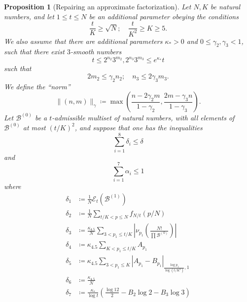 \documentclass[12pt,a4paper,reqno]{amsart}
\numberwithin{equation}{section}
\theoremstyle{plain}
\newtheorem{proposition}[theorem]{Proposition}
\theoremstyle{definition}
\newcommand\tuple{{\mathcal B}}
\newcommand\excess{{\mathcal{E}}}
\begin{document}
\begin{proposition}[Repairing an approximate factorization]\label{repair}  Let $N, K$ be natural numbers, and let $1 \leq t \leq N$ be an additional parameter obeying the conditions
\begin{equation}\label{conditions}
    \frac{t}{K} \geq \sqrt{N}; \quad \frac{t}{K^2} \geq K \geq 5.
\end{equation}
We also assume that there are additional parameters $\kappa_* > 0$ and $0 \leq \gamma_2, \gamma_3 < 1$, such that there exist $3$-smooth numbers
\begin{equation}\label{tlip} 
  t \leq 2^{n_2} 3^{m_2}, 2^{n_3} 3^{m_3} \leq e^{\kappa_*} t
\end{equation}
such that
\begin{equation}\label{nm}
  2m_2 \leq \gamma_2 n_2; \quad n_3 \leq 2\gamma_3 m_3.
\end{equation}
We define the ``norm''
$$ \| (n,m) \|_\gamma \coloneqq \max\left( \frac{n-2\gamma_2 m}{1-\gamma_2}, \frac{2m-\gamma_3 n}{1-\gamma_3} \right).$$
Let $\tuple^{(0)}$ be a $t$-admissible multiset of natural numbers, with all elements of $\tuple^{(0)}$ at most $(t/K)^2$, and suppose that one has the inequalities
\begin{equation}\label{delta-cond}
\sum_{i=1}^8 \delta_i \leq \delta
\end{equation}
and
\begin{equation}\label{alpha-cond}
  \sum_{i=1}^7 \alpha_i \leq 1
\end{equation} 
where
\begin{align}
\delta_1 &\coloneqq \frac{1}{N} \excess_t(\tuple^{(1)}) \label{delta1-def}  \\
\delta_2 &\coloneqq \frac{1}{N} \sum_{t/K < p \leq N} f_{N/t}(p/N) \label{delta2-def}  \\
\delta_3 &\coloneqq \frac{\kappa_{4.5}}{N}  \sum_{3 < p_1 \leq t/K} \left|\nu_{p_1}\left( \frac{N!}{\prod \tuple^{(0)}} \right)\right| \label{delta3-def}  \\
\delta_4 &\coloneqq \kappa_{4.5} \sum_{K < p_1 \leq t/K} A_{p_1} \label{delta4-def}  \\
\delta_5 &\coloneqq \kappa_{4.5} \sum_{3 < p_1 \leq K} |A_{p_1} - B_{p_1}|_{\frac{\log p_1}{\log(t/K^2)},1} \label{delta5-def}  \\
\delta_6 &\coloneqq \frac{\kappa_{4.5}}{N} \label{delta6-def}  \\
\delta_7 &\coloneqq \frac{\kappa_*}{\log t} \left( \frac{\log 12}{2} - B_2 \log 2 - B_3 \log 3\right)\label{delta7-def}  \\

\end{align}
\end{proposition}
\end{document}
